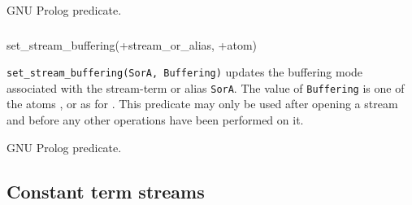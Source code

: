 \Portability

GNU Prolog predicate.

\subsubsection{\label{set-stream-buffering/2}}

\begin{TemplatesOneCol}
set\_stream\_buffering(+stream\_or\_alias, +atom)

\end{TemplatesOneCol}

\Description

\texttt{set\_stream\_buffering(SorA, Buffering)}
updates the buffering mode associated with the stream-term or alias
\texttt{SorA}. The value of \texttt{Buffering} is one of the atoms
,  or  as for 
. This predicate may only be used after opening a stream
and before any other operations have been performed on it.

\begin{PlErrors}






\end{PlErrors}

\Portability

GNU Prolog predicate.

\subsection{Constant term streams}
\label{Constant-term-streams}

